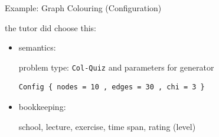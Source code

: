 


\begin{slide}{Example: Graph Colouring (Configuration)}

the tutor did choose this:
\begin{itemize}
\item semantics:

problem type: \verb|Col-Quiz| and parameters for generator
\begin{verbatim}
Config { nodes = 10 , edges = 30 , chi = 3 }
\end{verbatim}
\item bookkeeping:

school, lecture, exercise, time span, rating (level)
\end{itemize}

\end{slide}
